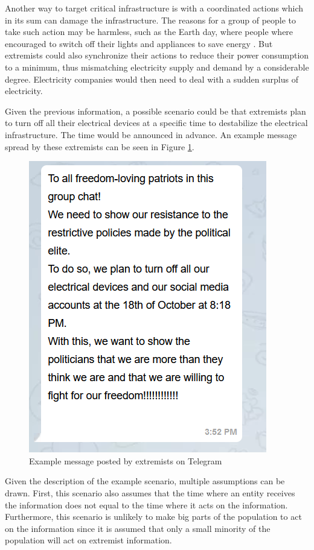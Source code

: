 Another way to target critical infrastructure is with a coordinated
actions which in its sum can damage the infrastructure. The 
reasons for a group of people to take such action may be harmless,
such as the Earth day, where people where encouraged to switch off their 
lights and appliances to save energy \cite{earthday}.
But extremists could also synchronize their actions to reduce their
power consumption to a minimum, thus mismatching electricity supply
and demand by a considerable degree. Electricity companies would 
then need to deal with a sudden surplus of electricity.

Given the previous information, a possible scenario could be 
that extremists plan to turn off all their electrical devices at 
a specific time to destabilize the electrical infrastructure. The
time would be announced in advance. An example message spread by
these extremists can be seen in Figure \ref{schwurbler}.

\begin{figure}[!ht]
    \center
    \includegraphics[scale=.7]{figs/schwurblerchat.png}
    \caption{Example message posted by extremists on Telegram}
    \label{schwurbler}
\end{figure}

Given the description of the example scenario, multiple assumptions can be drawn.
First, this scenario also assumes that the time where an entity receives the
information does not equal to the time where it acts on the information.
Furthermore, this scenario is unlikely to make big parts of the population
to act on the information since it is assumed that only a small minority
of the population will act on extremist information.

